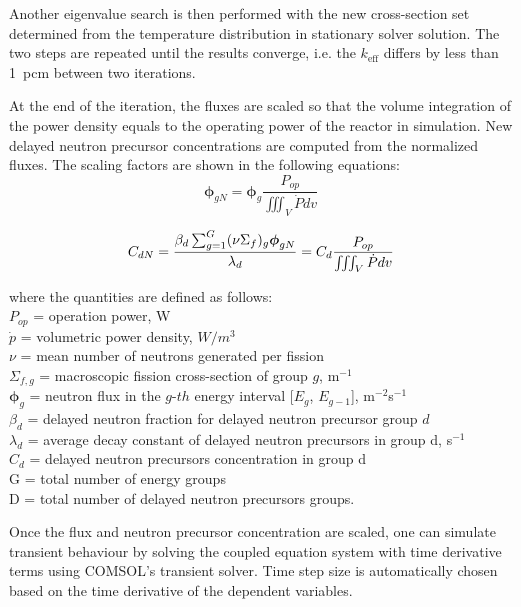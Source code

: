 \documentclass{elsarticle}
\newcommand{\keff}{{\ensuremath{k_{\mathrm{eff}}}} }
\newcommand{\flux}{{\ensuremath{\boldsymbol{\phi}}} }
\begin{document}
Another eigenvalue search is then performed with the new cross-section set determined from the temperature distribution in stationary solver solution. 
The two steps are repeated until the results converge, i.e. the \keff differs by less than 1~pcm between two iterations.

At the end of the iteration, the fluxes are scaled so that the volume integration of the power density equals to the operating power of the reactor in simulation. New delayed neutron precursor concentrations are computed from the normalized fluxes. The scaling factors are shown in the following equations:
\begin{equation}
    \flux_{gN} = \flux_g \frac{P_{op}}{\iiint_V{\dot{P}dv}}
\end{equation}

\begin{equation}
      C_{dN} = \frac{\beta_d \sum_{g=1}^G (\nu\Sigma_f)_g \flux_{gN}}{\lambda_d}\\
      = C_d\frac{P_{op}}{\iiint_V{\dot{P}dv}}
\end{equation}

where the quantities are defined as follows:\\
$P_{op}$ = operation power, W\\
$\dot{p}$ = volumetric power density, $W/m^3$\\
$\nu$ = mean number of neutrons generated per fission\\
$\Sigma_{f,g}$ = macroscopic fission cross-section of group $g$, m$^{-1}$\\
  $\flux_{g}$ = neutron flux in the $g$-$th$ energy interval [$E_g$, $E_{g-1}$], m$^{-2}$s$^{-1}$
\\
  $\beta_d$ = delayed neutron fraction for delayed neutron precursor group $d$
\\
  $\lambda_d$ = average decay constant of delayed neutron precursors in group d, s$^{-1}$
\\
  $C_d$ = delayed neutron precursors concentration in group d
 \\
 G = total number of energy groups\\
 D = total number of delayed neutron precursors groups.


Once the flux and neutron precursor concentration are scaled, one can simulate transient behaviour by solving the coupled equation system with time derivative terms using COMSOL's transient solver. Time step size is automatically chosen based on the time derivative of the dependent variables.
\end{document}
